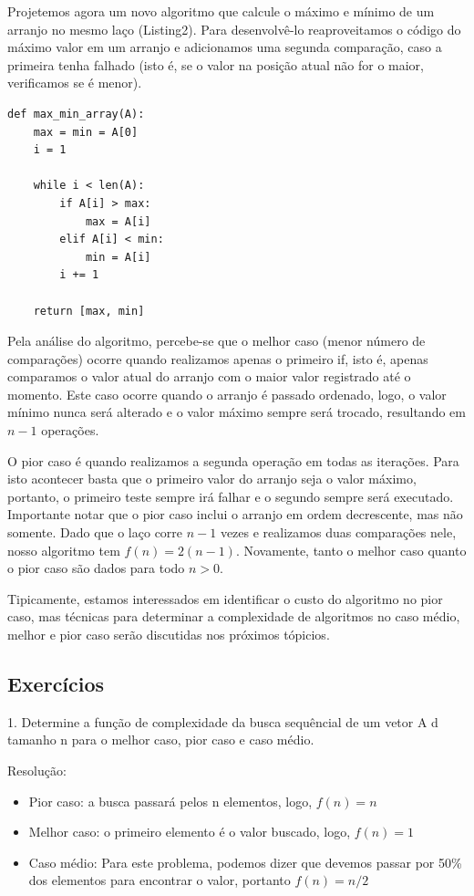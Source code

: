 \documentclass[ a4paper, twocolumn]{article}
\theoremstyle{definition}
\begin{document}
Projetemos agora um novo algoritmo que calcule o máximo e mínimo de um arranjo no mesmo laço (Listing2). Para desenvolvê-lo reaproveitamos o código do máximo valor em um arranjo e adicionamos uma segunda comparação, caso a primeira tenha falhado (isto é, se o valor na posição atual não for o maior, verificamos se é menor). 

\begin{lstlisting}[label=max_min_array,caption= Maior e menor valor de um arranjo]
def max_min_array(A):
    max = min = A[0]
    i = 1
    
    while i < len(A):
        if A[i] > max:
            max = A[i]
        elif A[i] < min:
            min = A[i]
        i += 1

    return [max, min]
\end{lstlisting}

Pela análise do algoritmo, percebe-se que o melhor caso (menor número de comparações) ocorre quando realizamos apenas o primeiro if, isto é, apenas comparamos o valor atual do arranjo com o maior valor registrado até o momento. Este caso ocorre quando o arranjo é passado ordenado, logo, o valor mínimo nunca será alterado e o valor máximo sempre será trocado, resultando em $n-1$ operações. 

O pior caso é quando realizamos a segunda operação em todas as iterações. Para isto acontecer basta que o primeiro valor do arranjo seja o valor máximo, portanto, o primeiro teste sempre irá falhar e o segundo sempre será executado.   Importante notar que o pior caso inclui o arranjo em ordem decrescente, mas não somente. Dado que o laço corre $n-1$ vezes e realizamos duas comparações nele, nosso algoritmo tem $f(n) = 2(n-1)$. Novamente, tanto o melhor caso quanto o pior caso são dados para todo $n>0$.

Tipicamente, estamos interessados em identificar o custo do algoritmo no pior caso, mas técnicas para determinar a complexidade de algoritmos no caso médio, melhor e pior caso serão discutidas nos próximos tópicios.

\subsection{Exercícios}
1. Determine a função de complexidade da busca sequêncial de um vetor A d tamanho n para o melhor caso, pior caso e caso médio.

Resolução: 

\begin{itemize}
\item Pior caso: a busca passará pelos n elementos, logo, $f(n) = n$
\item Melhor caso: o primeiro elemento é o valor buscado, logo, $f(n) =  1$
\item Caso médio: Para este problema, podemos dizer que devemos passar por 50\% dos elementos para encontrar o valor, portanto $f(n) = n/2$
\end{itemize}
\end{document}
